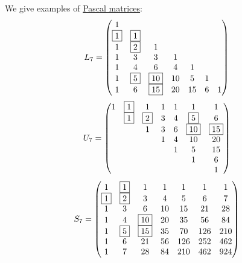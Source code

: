\begin{example}\label{ex:def:pascals_triangle}
  We give examples of \hyperref[def:pascal_matrix]{Pascal matrices}:
  \begin{equation*}
    L_7
    =
    \begin{pmatrix}
      1        &          &           &        &        &      &   \\
      \fbox{1} & \fbox{1} &           &        &        &      &   \\
      1        & \fbox{2} & 1         &        &        &      &   \\
      1        & 3        & 3         & 1      &        &      &   \\
      1        & 4        & 6         & 4      & 1      &      &   \\
      1        & \fbox{5} & \fbox{10} & 10     & 5      & 1    &   \\
      1        & 6        & \fbox{15} & 20     & 15     & 6    & 1
    \end{pmatrix}
  \end{equation*}
  \begin{equation*}
    U_7
    =
    \begin{pmatrix}
      1        & \fbox{1} & 1         & 1      & 1      & 1         & 1         \\
               & \fbox{1} & \fbox{2}  & 3      & 4      & \fbox{5}  & 6         \\
               &          & 1         & 3      & 6      & \fbox{10} & \fbox{15} \\
               &          &           & 1      & 4      & 10        & 20        \\
               &          &           &        & 1      & 5         & 15        \\
               &          &           &        &        & 1         & 6         \\
               &          &           &        &        &           & 1
    \end{pmatrix}
  \end{equation*}
  \begin{equation*}
    S_7
    =
    \begin{pmatrix}
      1        & \fbox{1} & 1         & 1      & 1      & 1      & 1   \\
      \fbox{1} & \fbox{2} & 3         & 4      & 5      & 6      & 7   \\
      1        & 3        & 6         & 10     & 15     & 21     & 28  \\
      1        & 4        & \fbox{10} & 20     & 35     & 56     & 84  \\
      1        & \fbox{5} & \fbox{15} & 35     & 70     & 126    & 210 \\
      1        & 6        & 21        & 56     & 126    & 252    & 462 \\
      1        & 7        & 28        & 84     & 210    & 462    & 924
    \end{pmatrix}
  \end{equation*}
\end{example}

